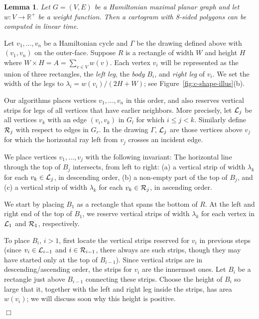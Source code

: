 \documentclass[11pt]{article}
\newcommand{\calL}{\ensuremath{{\cal L}}}
\newcommand{\calR}{\ensuremath{{\cal R}}}
\newtheorem{lemma}{Lemma}[section]
\newenvironment{proof}{{\bf Proof:} }{\hspace*{\fill}$\Box$\vspace{2mm}}
\begin{document}
\begin{lemma}\label{lem:ham-eight}
 Let $G=(V,E)$ be a Hamiltonian maximal planar graph and let $w:V\rightarrow \mathbb{R}^+$ be a weight
 function. Then a cartogram with 8-sided polygons can be computed in linear time.
\end{lemma}
\begin{proof}
Let $v_1, \ldots, v_n$ be a Hamiltonian cycle and $\Gamma$ be the
drawing defined above with $(v_1,v_n)$ on the outer-face.
Suppose $R$ is a rectangle of width $W$ and height $H$
where $W\times H=A=\sum_{v\in V}w(v)$.
Each vertex $v_i$ will be represented as the union of three
 rectangles, the \textit{left leg}, the \textit{body} $B_i$, and
\textit{right leg} of $v_i$. We set the width of the legs to $\lambda _i=w(v_i)/(2H+W)$;
see Figure~\ref{fig:c-shape-illus}(b).

Our algorithms places vertices $v_1,\dots,v_n$ in this order, and also
reserves vertical strips for legs of all vertices that have earlier neighbors.
More precisely, let $\calL_j$ be all vertices $v_k$ with an edge $(v_i,v_k)$
in $G_l$ for which $i\leq j<k$.  Similarly define $\calR_j$ with respect
to edges in $G_r$.  In the drawing $\Gamma$, $\calL_j$ are those vertices above
$v_j$ for which the horizontal ray left from $v_j$ crosses an incident edge.

We place vertices $v_1,\dots,v_j$ with the following invariant: The
horizontal line through the top of $B_j$ intersects, from left to right:
(a) a vertical strip of width $\lambda_k$ for
each $v_k\in \calL_j$, in descending order, (b) a non-empty part of the
top of $B_j$, and (c) a vertical strip of width $\lambda_k$ for
each $v_k\in \calR_j$, in ascending order.

We start by placing $B_1$ as a rectangle that spans the bottom of $R$.
At the left and right end of the top of $B_1$, we reserve vertical
strips of width $\lambda_k$ for each vertex in $\calL_1$ and $\calR_1$, respectively.

To place $B_i$, $i>1$, first locate the vertical strips reserved for
$v_i$ in previous steps (since $v_i\in \calL_{i-1}$ and $i\in \calR_{i-1}$,
there always are such strips, though they may have started only
at the top of $B_{i-1}$).  Since vertical strips are in
descending/ascending order, the strips for $v_i$ are the innermost ones.
Let $B_i$ be a rectangle just above $B_{i-1}$ connecting these strips.
Choose the height of $B_i$ so large that it, together with the left
and right leg inside the strips, has area $w(v_i)$; we will discuss
soon why this height is positive.


\end{proof}
\end{document}
